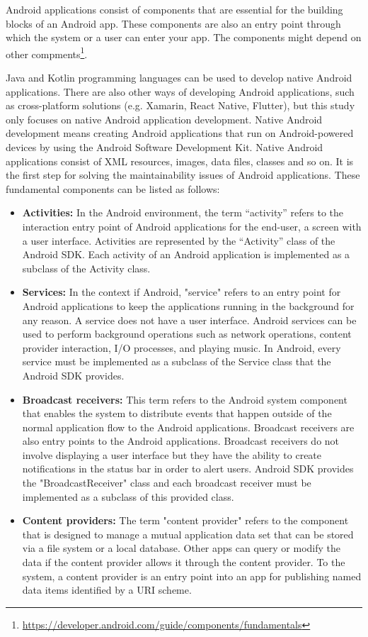 Android applications consist of components that are essential for the building blocks of an Android app. These components are also an entry point through which the system or a user can enter your app. The components might depend on other compments\footnote{\url{https://developer.android.com/guide/components/fundamentals}}.

Java and Kotlin programming languages can be used to develop native Android applications. There are also other ways of developing Android applications, such as cross-platform solutions (e.g. Xamarin, React Native, Flutter), but this study only focuses on native Android application development. Native Android development means creating Android applications that run on Android-powered devices by using the Android Software Development Kit. Native Android applications consist of  XML resources, images, data files, classes and so on. It is the first step for solving the maintainability issues of Android applications. These fundamental components can be listed as follows: 
\begin{itemize}
    \item \textbf{Activities:} In the Android environment, the term “activity” refers to the interaction entry point of Android applications for the end-user, a screen with a user interface. Activities are represented by the “Activity” class of the Android SDK. Each activity of an Android application is implemented as a subclass of the Activity class.
    \item \textbf{Services:} In the context if Android, "service" refers to an entry point for Android applications to keep the applications running in the background for any reason. A service does not have a user interface. Android services can be used to perform background operations such as network operations, content provider interaction, I/O processes, and playing music. In Android, every service must be implemented as a subclass of the Service class that the Android SDK provides.
    \item \textbf{Broadcast receivers:} This term refers to the Android system component that enables the system to distribute events that happen outside of the normal application flow to the Android applications. Broadcast receivers are also entry points to the Android applications. Broadcast receivers do not involve displaying a user interface but they have the ability to create notifications in the status bar in order to alert users. Android SDK provides the "BroadcastReceiver" class and each broadcast receiver must be implemented as a subclass of this provided class.
    \item \textbf{Content providers:} The term "content provider" refers to the component that is designed to manage a mutual application data set that can be stored via a file system or a local database. Other apps can query or modify the data if the content provider allows it through the content provider. To the system, a content provider is an entry point into an app for publishing named data items identified by a URI scheme.
\end{itemize}

